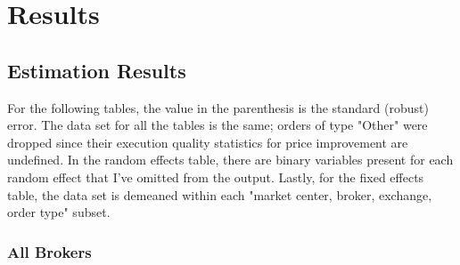 \documentclass[12pt,a4paper]{article}
\begin{document}
		
\pagebreak	
\section{Results}

	\subsection{Estimation Results}
	
		For the following tables, the value in the parenthesis is the standard (robust) error. The data set for all the tables is the same; orders of type "Other" were dropped since their execution quality statistics for price improvement are undefined. In the random effects table, there are binary variables present for each random effect that I've omitted from the output. Lastly, for the fixed effects table, the data set is demeaned within each "market center, broker, exchange, order type" subset. 
		
		\subsubsection{All Brokers}

		\vspace{1em}
		
\end{document}
